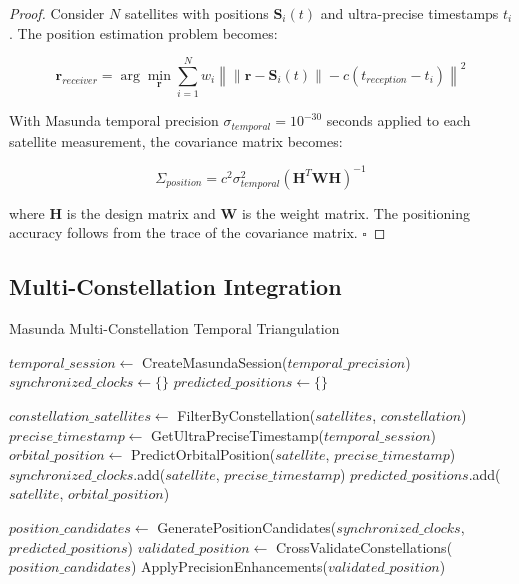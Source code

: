 \documentclass[12pt,a4paper]{article}
\begin{document}
\begin{proof}
Consider $N$ satellites with positions $\mathbf{S}_i(t)$ and ultra-precise timestamps $t_i$. The position estimation problem becomes:

\begin{equation}
\mathbf{r}_{receiver} = \arg\min_{\mathbf{r}} \sum_{i=1}^{N} w_i \left\| \|\mathbf{r} - \mathbf{S}_i(t)\| - c(t_{reception} - t_i) \right\|^2
\end{equation}

With Masunda temporal precision $\sigma_{temporal} = 10^{-30}$ seconds applied to each satellite measurement, the covariance matrix becomes:

\begin{equation}
\Sigma_{position} = c^2 \sigma_{temporal}^2 (\mathbf{H}^T \mathbf{W} \mathbf{H})^{-1}
\end{equation}

where $\mathbf{H}$ is the design matrix and $\mathbf{W}$ is the weight matrix. The positioning accuracy follows from the trace of the covariance matrix. $\square$
\end{proof}

\subsection{Multi-Constellation Integration}

\begin{algorithm}
\caption{Masunda Multi-Constellation Temporal Triangulation}
\begin{algorithmic}[1]
    \State $temporal\_session \gets$ CreateMasundaSession($temporal\_precision$)
    \State $synchronized\_clocks \gets \{\}$
    \State $predicted\_positions \gets \{\}$
    
        \State $constellation\_satellites \gets$ FilterByConstellation($satellites$, $constellation$)
            \State $precise\_timestamp \gets$ GetUltraPreciseTimestamp($temporal\_session$)
            \State $orbital\_position \gets$ PredictOrbitalPosition($satellite$, $precise\_timestamp$)
            \State $synchronized\_clocks$.add($satellite$, $precise\_timestamp$)
            \State $predicted\_positions$.add($satellite$, $orbital\_position$)
        \EndFor
    \EndFor
    
    \State $position\_candidates \gets$ GeneratePositionCandidates($synchronized\_clocks$, $predicted\_positions$)
    \State $validated\_position \gets$ CrossValidateConstellations($position\_candidates$)
    \State \Return ApplyPrecisionEnhancements($validated\_position$)
\EndProcedure
\end{algorithmic}
\end{algorithm}
\end{document}

